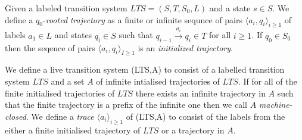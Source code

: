 \begin{figure} [h!]
\begin{center}
\end{center}

\label{fig:RBCAuton}
\end{figure}
\medskip
\begin{mydef}
Given a labeled transition system $LTS = (S,T,S_0,L)$ and a state $s \in S$. We define a $q_0$-\emph{rooted} \emph{trajectory} as a finite or infinite sequnce of pairs $\langle a_i, q_i \rangle_{i \geq 1}$ of labels $a_1 \in L$ and states $q_i \in S$  such that $q_{i-1} \xrightarrow{a_i} q_{i} \in T$ for all $i \geq 1$. If $q_0 \in S_0$ then the seqence of pairs $\langle a_i, q_i \rangle_{I \geq 1}$ is an \emph{initialized trajectory}. 
\end{mydef}
\medskip
\begin{mydef}
We define a live transition system (LTS,A) to consist of a labelled transition system $LTS$ and a set $A$ of infinite intialised trajectories of $LTS$. If for all of the finite initialised trajectories of $LTS$ there exists an infinite trajectory in $A$ such that the finite trajectory is a prefix of the infinite one then we call $A$ \emph{machine-closed}. We define a \emph{trace} $\langle a_i \rangle_{i \geq 1}$ of (LTS,A) to consist of the labels from the either a finite initialised trajectory of $LTS$ or a trajectory in $A$.
\end{mydef}
\medskip

